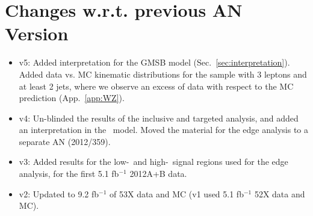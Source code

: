 \section{Changes w.r.t. previous AN Version}
\label{sec:changes}

\begin{itemize}

\item v5: Added interpretation for the GMSB model (Sec.~\ref{sec:interpretation}). Added data vs. MC kinematic distributions for the sample with 3 leptons and at least 2 jets, where we observe an excess of data with respect to the MC prediction (App.~\ref{app:WZ}).
\item v4: Un-blinded the results of the inclusive and targeted analysis, and added an interpretation in the \wzmet\ model. Moved the material for the edge analysis to a separate AN (2012/359).
\item v3: Added results for the low-\MET\ and high-\MET\ signal regions used for the edge analysis, for the first 5.1 fb$^{-1}$ 2012A+B data.
\item v2: Updated to 9.2 fb$^{-1}$ of 53X data and MC (v1 used 5.1 fb$^{-1}$ 52X data and MC).

\end{itemize}
